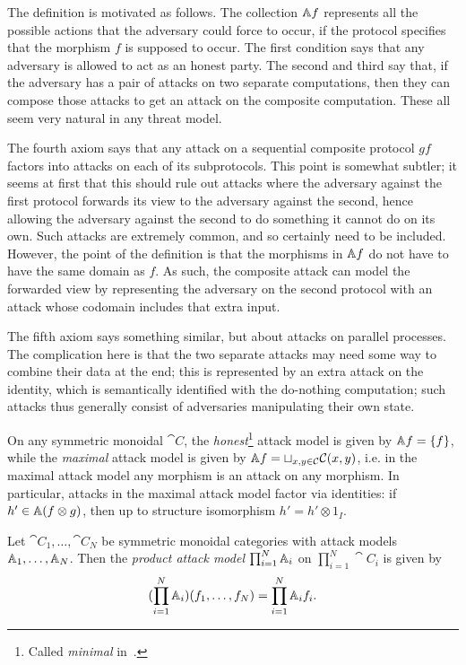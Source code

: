 The definition is motivated as follows. The collection $\AA f$ represents all
the possible actions that the adversary could force to occur, if the protocol
specifies that the morphism $f$ is supposed to occur. The first condition says
that any adversary is allowed to act as an honest party. The second and third
say that, if the adversary has a pair of attacks on two separate computations,
then they can compose those attacks to get an attack on the composite
computation. These all seem very natural in any threat model.

The fourth axiom says that any attack on a sequential composite protocol $gf$
factors into attacks on each of its subprotocols. This point is somewhat
subtler; it seems at first that this should rule out attacks where the adversary
against the first protocol forwards its view to the adversary against the second,
hence allowing the adversary against the second to do something it cannot do on
its own. Such attacks are extremely common, and so certainly need to be
included. However, the point of the definition is that the morphisms in $\AA f$
do not have to have the same domain as $f$. As such, the composite attack can
model the forwarded view by representing the adversary on the second protocol
with an attack whose codomain includes that extra input.

The fifth axiom says something similar, but about attacks on parallel processes.
The complication here is that the two separate attacks may need some way to
combine their data at the end; this is represented by an extra attack on the
identity, which is semantically identified with the do-nothing computation; such
attacks thus generally consist of adversaries manipulating their own state.

\begin{ex}\label{ex:trivial-attacks}
  On any symmetric monoidal $\cat{C}$, the \emph{honest}\footnote{Called
  \emph{minimal} in~\cite{broadbent-karvonen-2022}.} attack model is given
  by $\AA f = \{f\}$, while the \emph{maximal} attack model is given by $\AA f =
  \sqcup_{x,y\in\cat{C}}\cat{C}(x, y)$, i.e. in the maximal attack model any
  morphism is an attack on any morphism. In particular, attacks in the maximal
  attack model factor via identities: if $h'\in\AA (f\otimes g)$, then up to
  structure isomorphism $h' = h'\otimes 1_I$.
\end{ex}

\begin{dfn}
  Let $\cat{C}_1,\dots,\cat{C_N}$ be symmetric monoidal categories with attack
  models $\AA_1,\dots,\AA_N$. Then the \emph{product attack model}
  $\prod_{i=1}^N \AA_i$ on $\prod_{i=1}^N \cat{C}_i$ is given by \[
    (\prod_{i=1}^N \AA_i)(f_1,\dots, f_N) = \prod_{i=1}^N \AA_i f_i.
  \]
\end{dfn}

